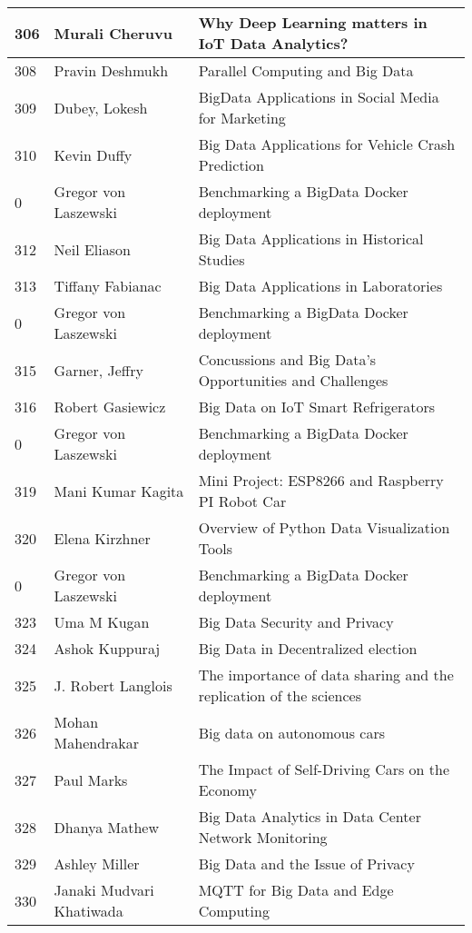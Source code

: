 \documentclass[12pt]{book}
\begin{document}
\begin{footnotesize}
\begin{longtable}{|p{1cm}p{5cm}p{9cm}|}
\hline
306 & Murali Cheruvu & Why Deep Learning matters in IoT Data Analytics?  \\
\hline
308 & Pravin Deshmukh & Parallel Computing and Big Data  \\
\hline
309 & Dubey, Lokesh & BigData Applications in Social Media for Marketing  \\
\hline
310 & Kevin Duffy & Big Data Applications for Vehicle Crash Prediction  \\
\hline
0 & Gregor von Laszewski & Benchmarking a BigData Docker deployment  \\
\hline
312 & Neil Eliason & Big Data Applications in Historical Studies  \\
\hline
313 & Tiffany Fabianac & Big Data Applications in Laboratories  \\
\hline
0 & Gregor von Laszewski & Benchmarking a BigData Docker deployment  \\
\hline
315 & Garner, Jeffry & Concussions and Big Data's Opportunities and Challenges  \\
\hline
316 & Robert Gasiewicz & Big Data on IoT Smart Refrigerators  \\
\hline
0 & Gregor von Laszewski & Benchmarking a BigData Docker deployment  \\
\hline
319 & Mani Kumar Kagita & Mini Project: ESP8266 and Raspberry PI Robot Car  \\
\hline
320 & Elena Kirzhner & Overview of Python Data Visualization Tools  \\
\hline
0 & Gregor von Laszewski & Benchmarking a BigData Docker deployment  \\
\hline
323 & Uma M Kugan & Big Data Security and Privacy  \\
\hline
324 & Ashok Kuppuraj & Big Data in Decentralized election  \\
\hline
325 & J. Robert Langlois & The importance of data sharing and the replication of the sciences  \\
\hline
326 & Mohan Mahendrakar & Big data on autonomous cars  \\
\hline
327 & Paul Marks & The Impact of Self-Driving Cars on the Economy  \\
\hline
328 & Dhanya Mathew & Big Data Analytics in Data Center Network Monitoring  \\
\hline
329 & Ashley Miller & Big Data and the Issue of Privacy  \\
\hline
330 & Janaki Mudvari Khatiwada & MQTT for Big Data and Edge Computing  \\
\hline

\end{longtable}
\end{footnotesize}
\end{document}
